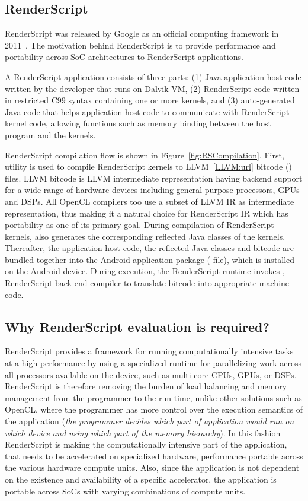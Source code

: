 
\subsection{RenderScript}
RenderScript was released by Google as an official computing framework in
2011~\cite{RederScript:url}. The motivation behind RenderScript is to provide
performance and portability across SoC architectures to RenderScript
applications.

A RenderScript application consists of three parts: (1) Java application host
code written by the developer that runs on Dalvik VM, (2) RenderScript code
written in restricted C99 syntax containing one or more kernels, and (3)
auto-generated Java code that helps application host code to communicate with
RenderScript kernel code, allowing functions such as memory binding between the
host program and the kernels.

RenderScript compilation flow is shown in Figure~\ref{fig:RSCompilation}.
First,  utility is used to compile RenderScript kernels to
LLVM~\ref{LLVM:url} bitcode () files. LLVM bitcode is LLVM
intermediate representation having backend support for a wide range of hardware
devices including general purpose processors, GPUs and DSPs. All OpenCL
compilers too use a subset of LLVM IR as intermediate representation, thus
making it a natural choice for RenderScript IR which has portability as one of
its primary goal. During compilation of RenderScript kernels, 
also generates the corresponding reflected Java classes of the kernels.
Thereafter, the application host code, the reflected Java classes and bitcode
are bundled together into the Android application package ( file),
which is installed on the Android device. During execution, the RenderScript
runtime invokes , RenderScript back-end compiler to translate
bitcode into appropriate machine code.

\subsection{Why RenderScript evaluation is required?}
RenderScript provides a framework
for running computationally intensive tasks at a high performance by using a
specialized runtime for 
parallelizing work across all processors available on the device, such as
multi-core CPUs, GPUs, or DSPs. RenderScript is therefore removing the
burden of load balancing and memory management from the programmer to the run-time, unlike other
solutions such as OpenCL, where the programmer has more control over the
execution semantics of the application ({\em the programmer decides which part
of application would run on which device and using which part of the memory hierarchy}).
In this fashion RenderScript is
making the computationally intensive part of the application, that needs to be
accelerated on specialized hardware, performance portable across the various hardware compute
units. Also, since the application is not dependent on the existence and
availability of a specific accelerator, the application is portable across SoCs
with varying combinations of compute units.

